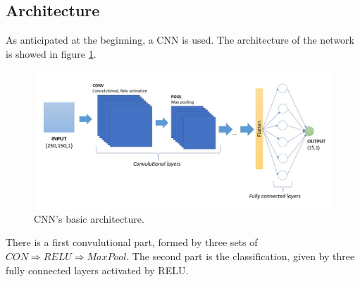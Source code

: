 \subsection{Architecture}

As anticipated at the beginning, a CNN is used. The architecture of the network is showed in figure \ref{fig:BasicArch}.
\begin{figure}[h!]
	\centering
	\includegraphics[width=0.7\linewidth]{./ImageFiles/CNN/BasicArch}
	\caption{CNN's basic architecture.}
	\label{fig:BasicArch}
\end{figure}

There is a first convulutional part, formed by three sets of $CON \Rightarrow RELU \Rightarrow MaxPool$. The second part is the classification, given by three fully connected layers activated by RELU.